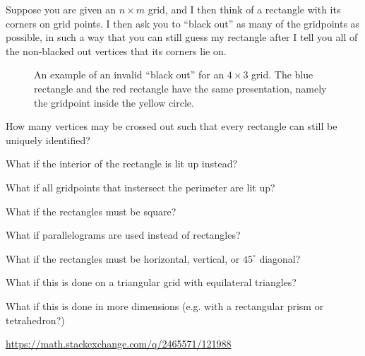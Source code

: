 \documentclass{article}
\begin{document}
Suppose you are given an $n \times m$ grid, and I then think of a rectangle with
its corners on grid points.
I then ask you to ``black out'' as many of the gridpoints as possible,
in such a way that you can still guess my rectangle after I tell you all of the
non-blacked out vertices that its corners lie on.\\
\begin{figure}[!h]
  \centering
  \caption{
    An example of an invalid ``black out'' for an $4 \times 3$ grid.
    The blue rectangle and the red rectangle have the same presentation, namely
    the gridpoint inside the yellow circle.
  }
\end{figure}

\begin{question}
  How many vertices may be crossed out such that every rectangle can still
    be uniquely identified?
\end{question}
\begin{related}
  \item What if the interior of the rectangle is lit up instead?
  \item What if all gridpoints that instersect the perimeter are lit up?
  \item What if the rectangles must be square?
  \item What if parallelograms are used instead of rectangles?
  \item What if the rectangles must be horizontal, vertical, or $45^\circ$ diagonal?
  \item What if this is done on a triangular grid with equilateral triangles?
  \item What if this is done in more dimensions
    (e.g. with a rectangular prism or tetrahedron?)
\end{related}
\begin{references}
  \item \url{https://math.stackexchange.com/q/2465571/121988}
\end{references}
\end{document}
